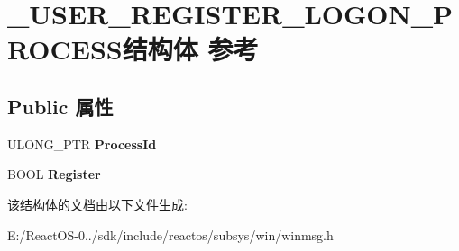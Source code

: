 \hypertarget{struct___u_s_e_r___r_e_g_i_s_t_e_r___l_o_g_o_n___p_r_o_c_e_s_s}{}\section{\+\_\+\+U\+S\+E\+R\+\_\+\+R\+E\+G\+I\+S\+T\+E\+R\+\_\+\+L\+O\+G\+O\+N\+\_\+\+P\+R\+O\+C\+E\+S\+S结构体 参考}
\label{struct___u_s_e_r___r_e_g_i_s_t_e_r___l_o_g_o_n___p_r_o_c_e_s_s}
\subsection*{Public 属性}
\begin{DoxyCompactItemize}
\item 
\mbox{\label{struct___u_s_e_r___r_e_g_i_s_t_e_r___l_o_g_o_n___p_r_o_c_e_s_s_ae9e4dc5163dd7d168cc692dc4e81fc1b}} 
U\+L\+O\+N\+G\+\_\+\+P\+TR {\bfseries Process\+Id}
\item 
\mbox{\label{struct___u_s_e_r___r_e_g_i_s_t_e_r___l_o_g_o_n___p_r_o_c_e_s_s_aa6b27f21a2381837a452996c54dbf3ad}} 
B\+O\+OL {\bfseries Register}
\end{DoxyCompactItemize}


该结构体的文档由以下文件生成\+:\begin{DoxyCompactItemize}
\item 
E\+:/\+React\+O\+S-\/0../sdk/include/reactos/subsys/win/winmsg.\+h\end{DoxyCompactItemize}
